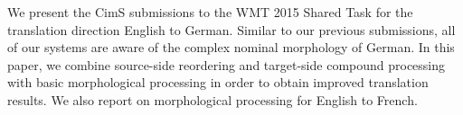 We present the CimS submissions to the WMT 2015 Shared Task for the translation direction English to German. Similar to our previous submissions, all of our systems are aware of the complex nominal morphology of German. In this paper, we combine source-side reordering and target-side compound processing with basic morphological processing in order to obtain improved translation results. We also report on morphological processing for English to French.
